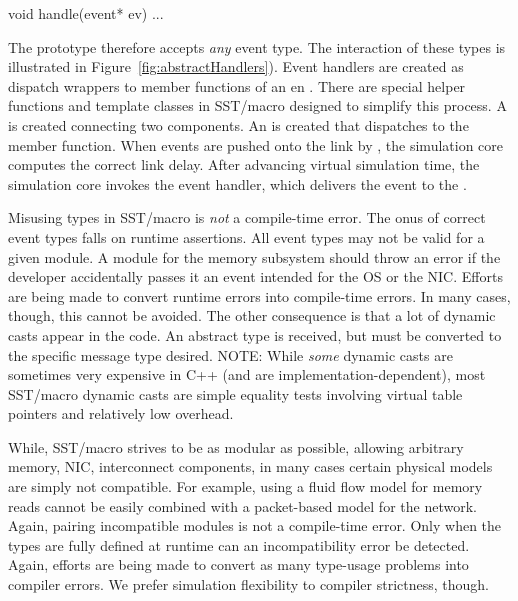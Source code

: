 \begin{CppCode}
void handle(event* ev){
...
}
\end{CppCode}
The prototype therefore accepts \emph{any} event type. 
The interaction of these types is illustrated in Figure~\ref{fig:abstractHandlers}).
Event handlers are created as dispatch wrappers to member functions of an en .
There are special helper functions and template classes in SST/macro designed to simplify this process.
A  is created connecting two components.
An  is created that dispatches to the  member function.
When events are pushed onto the link by ,
the simulation core computes the correct link delay.
After advancing virtual simulation time,
the simulation core invokes the event handler, which delivers the event to the .

Misusing types in SST/macro is \emph{not} a compile-time error.
The onus of correct event types falls on runtime assertions.
All event types may not be valid for a given module.
A module for the memory subsystem should throw an error if the developer accidentally passes it an event intended for the OS or the NIC.
Efforts are being made to convert runtime errors into compile-time errors.
In many cases, though, this cannot be avoided.
The other consequence is that a lot of dynamic casts appear in the code.
An abstract  type is received, but must be converted to the specific message type desired.
NOTE: While \emph{some} dynamic casts are sometimes very expensive in C++ (and are implementation-dependent),
most SST/macro dynamic casts are simple equality tests involving virtual table pointers and relatively low overhead.

While, SST/macro strives to be as modular as possible, allowing arbitrary memory, NIC, interconnect components,
in many cases certain physical models are simply not compatible.
For example, using a fluid flow model for memory reads cannot be easily combined with a packet-based model for the network.
Again, pairing incompatible modules is not a compile-time error.
Only when the types are fully defined at runtime can an incompatibility error be detected.
Again, efforts are being made to convert as many type-usage problems into compiler errors.
We prefer simulation flexibility to compiler strictness, though. 

